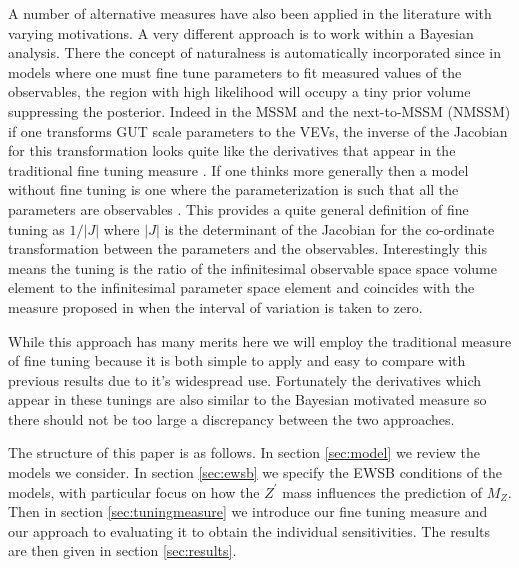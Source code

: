 \documentclass[preprint,amsmath,amssymb,aps,superscriptaddress,prd,
showpacs,floatfix,nofootinbib]{revtex4-1}
\begin{document}
A number of alternative measures have also been applied in the
literature \cite{Anderson:1994dz, Anderson:1994tr, Anderson:1995cp,
Anderson:1996ew, Ciafaloni:1996zh, Chan:1997bi, Barbieri:1998uv,
Giusti:1998gz, Casas:2003jx, Casas:2004uu, Casas:2004gh,
Casas:2006bd, Kitano:2005wc, Athron:2007ry, Athron:2007qr,
Baer:2012up} with varying motivations.  A very different approach is
to work within a Bayesian analysis.  There the concept of naturalness
is automatically incorporated since in models where one must fine tune
parameters to fit measured values of the observables, the region with
high likelihood will occupy a tiny prior volume \cite{Allanach:2007qk,
Cabrera:2008tj, Ghilencea:2012gz, Ghilencea:2012qk, Fichet:2012sn,
Kim:2013uxa} suppressing the posterior.  Indeed in the MSSM and
the next-to-MSSM (NMSSM) if one transforms GUT scale parameters to the
VEVs, the inverse of the Jacobian for this transformation looks quite like
the derivatives that appear in the traditional fine tuning measure
\cite{Allanach:2007qk, Cabrera:2008tj, Kim:2013uxa}.  If one thinks
more generally then a model without fine tuning is one where the
parameterization is such that all the parameters are observables
\cite{Fichet:2012sn, Kim:2013uxa}.  This provides a quite general
definition of fine tuning as $1/|J|$ where $|J|$ is the determinant of
the Jacobian for the co-ordinate transformation between the parameters
and the observables.  Interestingly this means the tuning is the ratio
of the infinitesimal observable space space volume element to the
infinitesimal parameter space element and coincides with the measure
proposed in \cite{Athron:2007ry} when the interval of variation is
taken to zero.

While this approach has many merits here we will employ the traditional
measure of fine tuning because it is both simple to apply and easy to
compare with previous results due to it's widespread use.  Fortunately
the derivatives which appear in these tunings are also similar to the
Bayesian motivated measure so there should not be too large a
discrepancy between the two approaches.

The structure of this paper is as follows.  In section \ref{sec:model}
we review the models we consider.  In section \ref{sec:ewsb} we
specify the EWSB conditions of the models, with particular focus on
how the $Z^\prime$ mass influences the prediction of $M_Z$.  Then in
section \ref{sec:tuningmeasure} we introduce our fine tuning measure
and our approach to evaluating it to obtain the individual
sensitivities.  The results are then given in section
\ref{sec:results}.
\end{document}
